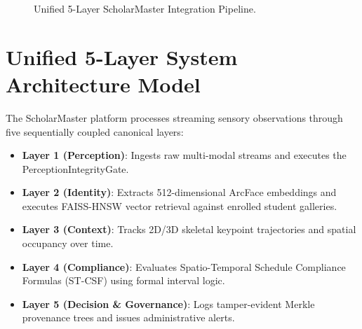 \documentclass[conference]{IEEEtran}
\begin{document}
\begin{figure}[htbp]
\centering
{}
\caption{Unified 5-Layer ScholarMaster Integration Pipeline.}
\label{fig:p25_pipeline}
\end{figure}

\section{Unified 5-Layer System Architecture Model}
The ScholarMaster platform processes streaming sensory observations through five sequentially coupled canonical layers:
\begin{itemize}
    \item \textbf{Layer 1 (Perception)}: Ingests raw multi-modal streams and executes the PerceptionIntegrityGate.
    \item \textbf{Layer 2 (Identity)}: Extracts 512-dimensional ArcFace embeddings and executes FAISS-HNSW vector retrieval against enrolled student galleries.
    \item \textbf{Layer 3 (Context)}: Tracks 2D/3D skeletal keypoint trajectories and spatial occupancy over time.
    \item \textbf{Layer 4 (Compliance)}: Evaluates Spatio-Temporal Schedule Compliance Formulas (ST-CSF) using formal interval logic.
    \item \textbf{Layer 5 (Decision & Governance)}: Logs tamper-evident Merkle provenance trees and issues administrative alerts.
\end{itemize}
\end{document}
